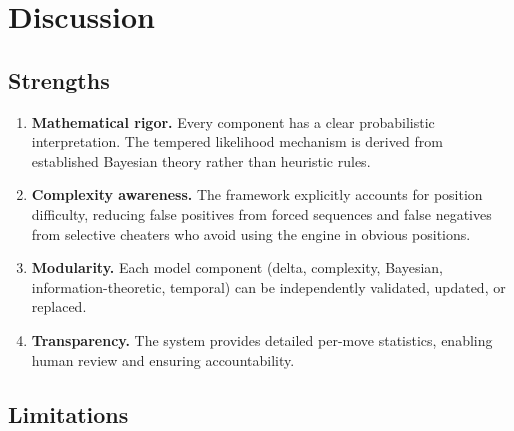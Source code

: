 \documentclass[11pt,a4paper]{article}
\begin{document}
\section{Discussion}
\label{sec:discussion}

\subsection{Strengths}

\begin{enumerate}
    \item \textbf{Mathematical rigor.} Every component has a clear
          probabilistic interpretation. The tempered likelihood mechanism is
          derived from established Bayesian theory rather than heuristic rules.
    \item \textbf{Complexity awareness.} The framework explicitly accounts for
          position difficulty, reducing false positives from forced sequences
          and false negatives from selective cheaters who avoid using the engine
          in obvious positions.
    \item \textbf{Modularity.} Each model component (delta, complexity,
          Bayesian, information-theoretic, temporal) can be independently
          validated, updated, or replaced.
    \item \textbf{Transparency.} The system provides detailed per-move
          statistics, enabling human review and ensuring accountability.
\end{enumerate}

\subsection{Limitations}
\end{document}
